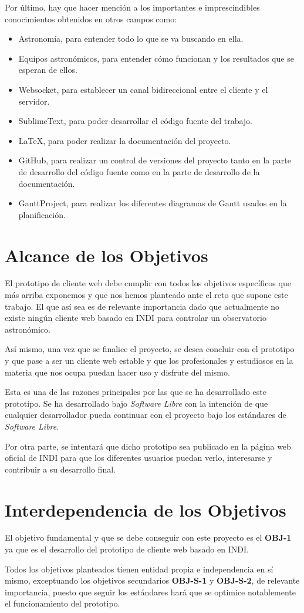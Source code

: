 Por último, hay que hacer mención a los importantes e imprescindibles conocimientos obtenidos en otros campos como:
\begin{itemize}
  \item Astronomía, para entender todo lo que se va buscando en ella.
  \item Equipos astronómicos, para entender cómo funcionan y los resultados que se esperan de ellos.
  \item Websocket, para establecer un canal bidireccional entre el cliente y el servidor.
  \item SublimeText, para poder desarrollar el código fuente del trabajo.
  \item LaTeX, para poder realizar la documentación del proyecto.
  \item GitHub, para realizar un control de versiones del proyecto tanto en la parte de desarrollo del código fuente como en la parte de desarrollo de la documentación.
  \item GanttProject, para realizar los diferentes diagramas de Gantt \cite{DiagramaGantt} usados en la planificación.
\end{itemize}


\section{Alcance de los Objetivos}
El prototipo de cliente web debe cumplir con todos los objetivos específicos que más arriba exponemos y que nos hemos planteado ante el reto que supone este trabajo. El que así sea es de relevante importancia dado que actualmente no existe ningún cliente web basado en INDI para controlar un observatorio astronómico.

Así mismo, una vez que se finalice el proyecto, se desea concluir con el prototipo y que pase a ser un cliente web estable y que los profesionales y estudiosos en la materia que nos ocupa puedan hacer uso y disfrute del mismo.

Esta es una de las razones principales por las que se ha desarrollado este prototipo. Se ha desarrollado bajo \textit{Software Libre} con la intención de que cualquier desarrollador pueda continuar con el proyecto bajo los estándares de \textit{Software Libre}.

Por otra parte, se intentará que dicho prototipo sea publicado en la página web oficial de INDI para que los diferentes usuarios puedan verlo, interesarse y contribuir a su desarrollo final.


\section{Interdependencia de los Objetivos}
El objetivo fundamental y que se debe conseguir con este proyecto es el \textbf{OBJ-1} ya que es el desarrollo del prototipo de cliente web basado en INDI.

Todos los objetivos planteados tienen entidad propia e independencia en sí mismo, exceptuando los objetivos secundarios \textbf{OBJ-S-1} y \textbf{OBJ-S-2}, de relevante importancia, puesto que seguir los estándares hará que se optimice notablemente el funcionamiento del prototipo.
